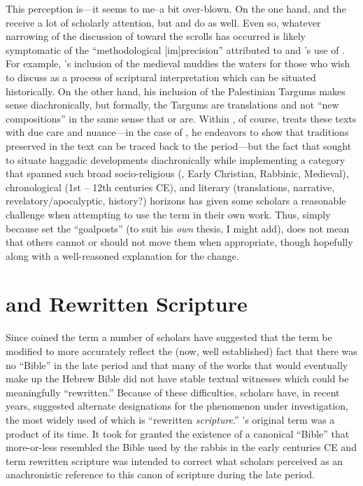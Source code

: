  This perception is---it seems to me--a bit over-blown. On the one hand, \ga and the \templescroll receive a lot of scholarly attention, but \jub and \ant do as well. Even so, whatever narrowing of the discussion of \rwb toward the \qumran scrolls has occurred is likely symptomatic of the ``methodological {[}im{]}precision'' attributed to  and \vermes's use of \rwB. For example, \vermes's inclusion of the medieval \sefer muddies the waters for those who wish to discuss \rwb as a process of scriptural interpretation which can be situated historically. On the other hand, his inclusion of the Palestinian Targums makes sense diachronically, but formally, the Targums are translations and not ``new compositions'' in the same sense that \jub or \ga are. Within , of course, \vermes treats these texts with due care and nuance---in the case of \sefer, he endeavors to show that traditions preserved in the text can be traced back to the \secondtemple period---but the fact that \vermes sought to situate haggadic developments diachronically while implementing a category that spanned such broad socio-religious (\qumran, Early Christian, Rabbinic, Medieval), chronological (1st -- 12th centuries CE), and literary (translations, narrative, revelatory/apocalyptic, history?) horizons has given some scholars a reasonable challenge when attempting to use the term in their own work. Thus, simply because \vermes set the ``goalposts'' (to suit his \emph{own} thesis, I might add), does not mean that others cannot or should not move them when appropriate, though hopefully along with a well-reasoned explanation for the change. 

 \hypertarget{rwb-and-rewritten-scripture}{%
\section{\RWB and Rewritten Scripture}\label{rwb-and-rewritten-scripture}} 

 Since \vermes coined the term \rwb a number of scholars have suggested that the term be modified to more accurately reflect the (now, well established) fact that there was no ``Bible'' in the late \secondtemple period and that many of the works that would eventually make up the Hebrew Bible did not have stable textual witnesses which could be meaningfully ``rewritten.'' Because of these difficulties, scholars have, in recent years, suggested alternate designations for the phenomenon under investigation, the most widely used of which is ``rewritten \emph{scripture}.'' \vermes's original term \rwb was a product of its time. It took for granted the existence of a canonical ``Bible'' that more-or-less resembled the Bible used by the rabbis in the early centuries CE and term rewritten scripture was intended to correct what scholars perceived as an anachronistic reference to this canon of scripture during the late \secondtemple period.\autocites[58--59]{campbell_zsengeller2014}[See also][]{ulrich_mcdonald-sanders2002}[and][]{ulrich_zsengeller2014} 

